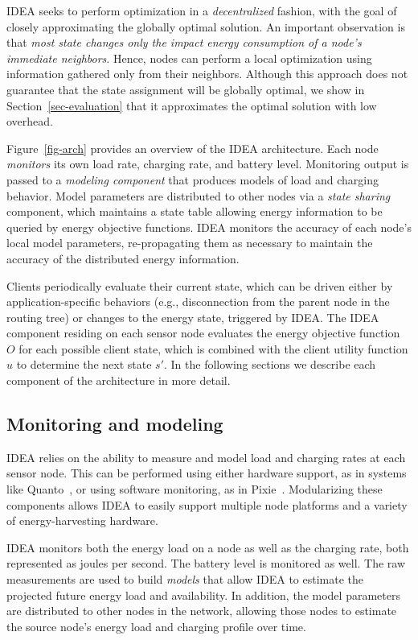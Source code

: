 IDEA seeks to perform optimization in a {\em decentralized} fashion,
with the goal of closely approximating the globally optimal solution. An
important observation is that {\em most state changes only the impact energy
consumption of a node's immediate neighbors}.  Hence, nodes can perform a
local optimization using information gathered only from their neighbors.
Although this approach does not guarantee that the state assignment will be
globally optimal, we show in Section~\ref{sec-evaluation} that it
approximates the optimal solution with low overhead.

Figure~\ref{fig-arch} provides an overview of the IDEA architecture.
Each node {\em monitors} its own load rate, charging rate, and battery level.
Monitoring output is passed to a {\em modeling component} that produces
models of load and charging behavior.  Model parameters are distributed to
other nodes via a {\em state sharing} component, which maintains a state
table allowing energy information to be queried by energy objective
functions. IDEA monitors the accuracy of each node's local model parameters,
re-propagating them as necessary to maintain the accuracy of the distributed
energy information.

Clients periodically evaluate their current state, which can be driven either
by application-specific behaviors (e.g., disconnection from the parent node
in the routing tree) or changes to the energy state, triggered by IDEA. The
IDEA component residing on each sensor node evaluates the energy objective
function $O$ for each possible client state, which is combined with the
client utility function $u$ to determine the next state $s'$. In the
following sections we describe each component of the architecture in more
detail.

\subsection{Monitoring and modeling}

IDEA relies on the ability to measure and model load and charging
rates at each sensor node. This can be performed using either
hardware support, as in systems like Quanto~\cite{quanto-osdi08}, or
using software monitoring, as in Pixie~\cite{pixie-sensys08}. 
Modularizing these components allows IDEA to easily support multiple node
platforms and a variety of energy-harvesting hardware.

IDEA monitors both the energy load on a node as well as the charging rate,
both represented as joules per second. The battery level is monitored as
well. The raw measurements are used to build {\em models} that allow IDEA to
estimate the projected future energy load and availability. In addition, the
model parameters are distributed to other nodes in the network, allowing
those nodes to estimate the source node's energy load and charging profile
over time. 

